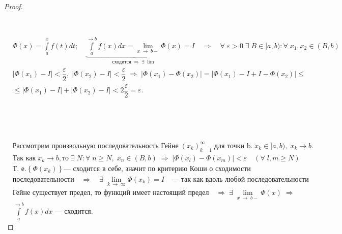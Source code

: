 \documentclass[../main.tex]{subfiles}
\begin{document}
\begin{proof}

    ~

    \boxed{\Rightarrow} 

    ~
    
    \(
    \begin{aligned}
        &\Phi(x) = \displaystyle\int\limits_{ a}^{ x} f(t)dt;\quad \underbrace{ \displaystyle\int\limits_{ a}^{ \rightarrow b} f(x)dx = \lim\limits_{ x \; \rightarrow \; b-} \Phi(x)}_{\text{сходится} \; \Rightarrow \; \exists \; \lim } = I \quad\Rightarrow\quad \forall \; \varepsilon> 0 \; \exists \; B \in [a, b): \forall \; x_1, x_2 \in (B, b) \\[5pt] 
        &\left| \Phi(x_1) - I\right| < \dfrac{ \varepsilon}{ 2}, \; \left| \Phi(x_2) - I\right| < \dfrac{ \varepsilon}{ 2} \;\Rightarrow\; \left| \Phi(x_1) - \Phi(x_2)\right| = \left| \Phi(x_1) - I + I - \Phi(x_2)\right| \leq \\[5pt] 
        &\leq \left| \Phi(x_1) - I\right| + \left| \Phi(x_2) - I\right| < 2 \dfrac{ \varepsilon}{ 2} = \varepsilon.
    \end{aligned}
    \)

    ~
    
    \newpage

    \boxed{\Leftarrow}

    ~

    \( 
    \begin{aligned}
        &\text{Рассмотрим произвольную последовательность Гейне}\; (x_k)_{k = 1}^\infty \; \text{для точки b.}\; x_k \in [a, b), \; x_k \rightarrow  b. \\[5pt]
        &\text{Так как} \; x_k \rightarrow b, \text{то} \; \exists \; N: \forall \; n \geq  N, \; x_n \in (B, b) \; \Rightarrow \; \left| \Phi(x_l) - \Phi(x_m)\right| < \varepsilon \quad ( \forall \; l, m \geq N ) \\[5pt]
        &\text{Т. е.} \left\{ \Phi(x_k)\right\}  \text{--- сходится в себе, значит по критерию Коши о сходимости} \\[5 pt] 
        &\text{последовательности}\quad \Rightarrow\quad \exists \; \lim\limits_{ k \; \rightarrow \; \infty} \Phi(x_k) = I\quad \text{--- так как вдоль любой последовательности} \\[5pt] 
        &\text{Гейне существует предел, то функций имеет настоящий предел}\quad \Longrightarrow \; \exists \; \lim\limits_{ x \; \rightarrow \; b-} \Phi(x) \; \Rightarrow \\
        &\displaystyle\int\limits_{ a}^{ \rightarrow b} f(x)dx \; \text{--- сходится}. 
     \end{aligned}
    \)
\end{proof}
\end{document}
